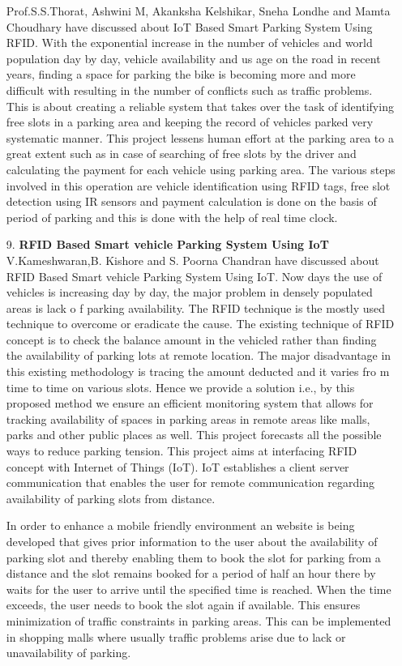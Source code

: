 \documentclass[12pt,a4paper]{report}
\begin{document}
\begin{itemize}
Prof.S.S.Thorat, Ashwini M, Akanksha Kelshikar, Sneha Londhe and Mamta Choudhary
have discussed about IoT Based Smart Parking System Using RFID.
	With the exponential increase  in the number of vehicles and world  population day by day, vehicle availability and us age on the road in recent years, finding a space for
	parking the bike is becoming more and more difficult with resulting in the number of conflicts such as traffic problems. This is about creating a reliable system that takes over the task of identifying free slots in a parking area and keeping the record of vehicles parked very systematic manner. This project lessens human 
	effort at the parking area to a great extent such as in case of searching of free slots by the driver and calculating the payment for each vehicle using parking area. The 
	various steps involved in this operation are vehicle identification using RFID tags, free slot detection using IR sensors and payment calculation is done on the basis of 
	period of parking and this is done with the help of real time clock.\newpage
	\item[ 9. ] \textbf{RFID Based Smart vehicle Parking System Using IoT}\\

	V.Kameshwaran,B. Kishore and S. Poorna Chandran have discussed about RFID Based Smart vehicle Parking System Using IoT.
	Now days
	the use of vehicles is increasing day by day, the major problem in densely populated areas is lack o
	f parking availability.  The RFID  technique  is  the  mostly  used  technique  to  overcome  or  eradicate  the  cause.  
	The  existing  technique  of 
	RFID concept is to check the balance amount in the vehicled rather than finding the availability of parking lots at remote location. 
	The major disadvantage in this existing methodology is tracing the amount deducted and it varies fro
	m time to time on various
	slots. Hence we provide a solution i.e., by this proposed method we ensure an 
	efficient monitoring system
	that allows for tracking 
	availability of spaces in parking areas in remote areas like malls, parks and other public places as
	well. This project forecasts all 
	the  possible  ways  to  reduce  parking tension. This  project aims  at interfacing  RFID  concept  with  Internet  of  Things
	(IoT).  IoT 
	establishes a client server communication that enables the user for remote communication regarding availability of parking slots 
	from distance.\par \hspace{0.5cm} In order to enhance a mobile friendly environment an website is being developed that gives prior information to 
	the user about the availability of parking slot and thereby enabling them to book the slot for parking from a distance and the slot remains  booked for  a  period of  half  an  hour  there by  waits  for  the  user  to  arrive  until  the  specified time  is  reached. When the 
	time exceeds, the user needs to book the slot again if available. This ensures minimization of traffic constraints in parking
	areas. This can be implemented in shopping malls where usually traffic problems arise due to lack or unavailability of parking.


\end{itemize}
\end{document}
